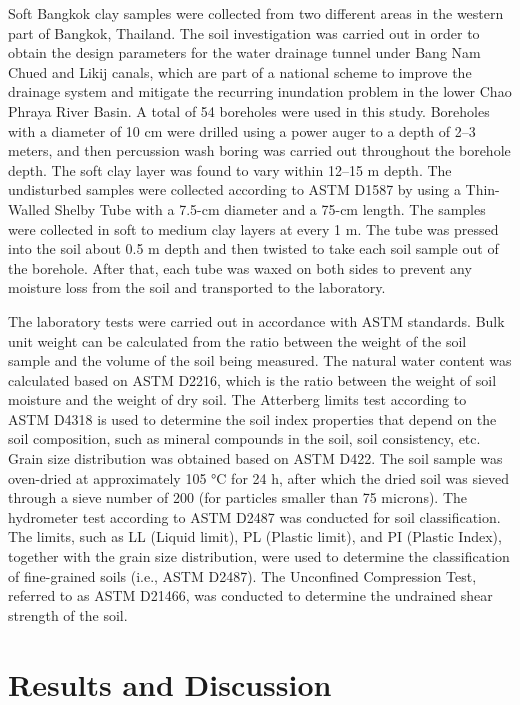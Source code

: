 \documentclass[12pt,a4paper]{article}
\begin{document}
	Soft Bangkok clay samples were collected from two different areas in the western part of Bangkok, Thailand. The soil investigation was carried out in order to obtain the design parameters for the water drainage tunnel under Bang Nam Chued and Likij canals, which are part of a national scheme to improve the drainage system and mitigate the recurring inundation problem in the lower Chao Phraya River Basin. A total of 54 boreholes were used in this study. Boreholes with a diameter of 10 cm were drilled using a power auger to a depth of 2–3 meters, and then percussion wash boring was carried out throughout the borehole depth. The soft clay layer was found to vary within 12–15 m depth. The undisturbed samples were collected according to ASTM D1587 by using a Thin-Walled Shelby Tube with a 7.5-cm diameter and a 75-cm length. The samples were collected in soft to medium clay layers at every 1 m. The tube was pressed into the soil about 0.5 m depth and then twisted to take each soil sample out of the borehole. After that, each tube was waxed on both sides to prevent any moisture loss from the soil and transported to the laboratory.
	
	The laboratory tests were carried out in accordance with ASTM standards. Bulk unit weight can be calculated from the ratio between the weight of the soil sample and the volume of the soil being measured. The natural water content was calculated based on ASTM D2216, which is the ratio between the weight of soil moisture and the weight of dry soil. The Atterberg limits test according to ASTM D4318 is used to determine the soil index properties that depend on the soil composition, such as mineral compounds in the soil, soil consistency, etc. Grain size distribution was obtained based on ASTM D422. The soil sample was oven-dried at approximately 105 °C for 24 h, after which the dried soil was sieved through a sieve number of 200 (for particles smaller than 75 microns). The hydrometer test according to ASTM D2487 was conducted for soil classification. The limits, such as LL (Liquid limit), PL (Plastic limit), and PI (Plastic Index), together with the grain size distribution, were used to determine the classification of fine-grained soils (i.e., ASTM D2487). The Unconfined Compression Test, referred to as ASTM D21466, was conducted to determine the undrained shear strength of the soil.
	
	\section{Results and Discussion}
	
\end{document}
